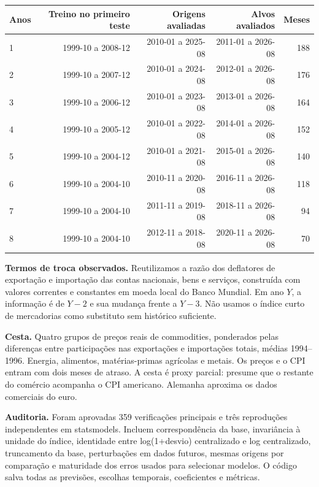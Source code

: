 \documentclass[10pt,a4paper]{article}
\begin{document}
{\footnotesize
\begin{center}\begin{tabular}{lrrrr}\toprule
Anos & Treino no primeiro teste & Origens avaliadas & Alvos avaliados & Meses \\ \midrule
1 & 1999-10 a 2008-12 & 2010-01 a 2025-08 & 2011-01 a 2026-08 & 188 \\
2 & 1999-10 a 2007-12 & 2010-01 a 2024-08 & 2012-01 a 2026-08 & 176 \\
3 & 1999-10 a 2006-12 & 2010-01 a 2023-08 & 2013-01 a 2026-08 & 164 \\
4 & 1999-10 a 2005-12 & 2010-01 a 2022-08 & 2014-01 a 2026-08 & 152 \\
5 & 1999-10 a 2004-12 & 2010-01 a 2021-08 & 2015-01 a 2026-08 & 140 \\
6 & 1999-10 a 2004-10 & 2010-11 a 2020-08 & 2016-11 a 2026-08 & 118 \\
7 & 1999-10 a 2004-10 & 2011-11 a 2019-08 & 2018-11 a 2026-08 & 94 \\
8 & 1999-10 a 2004-10 & 2012-11 a 2018-08 & 2020-11 a 2026-08 & 70 \\\bottomrule\end{tabular}\end{center}}

\textbf{Termos de troca observados.} Reutilizamos a razão dos deflatores de exportação e importação das contas nacionais, bens e serviços, construída com valores correntes e constantes em moeda local do Banco Mundial. Em ano $Y$, a informação é de $Y-2$ e sua mudança frente a $Y-3$. Não usamos o índice curto de mercadorias como substituto sem histórico suficiente.

\textbf{Cesta.} Quatro grupos de preços reais de commodities, ponderados pelas diferenças entre participações nas exportações e importações totais, médias 1994--1996. Energia, alimentos, matérias-primas agrícolas e metais. Os preços e o CPI entram com dois meses de atraso. A cesta é proxy parcial: presume que o restante do comércio acompanha o CPI americano. Alemanha aproxima os dados comerciais do euro.

\textbf{Auditoria.} Foram aprovadas 359 verificações principais e três reproduções independentes em statsmodels. Incluem correspondência da base, invariância à unidade do índice, identidade entre log(1+desvio) centralizado e log centralizado, truncamento da base, perturbações em dados futuros, mesmas origens por comparação e maturidade dos erros usados para selecionar modelos. O código salva todas as previsões, escolhas temporais, coeficientes e métricas.
\end{document}
